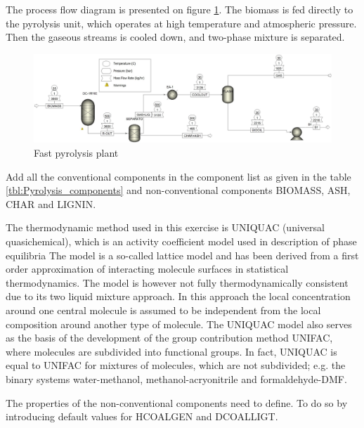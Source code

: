 The process flow diagram is presented on figure \ref{fig:Pyrolasis}. The biomass is fed directly to the pyrolysis unit, which operates at high temperature and atmospheric pressure. Then the gaseous streams is cooled down, and two-phase mixture is separated.

\begin{figure}[h!]
	\centering
	\includegraphics[width=\linewidth]{Figures/TchermochemicalProcesses/Pyrolysis.jpeg}
	\caption{Fast pyrolysis plant}
	\label{fig:Pyrolasis}
\end{figure}

Add all the conventional components in the component list as given in the table \ref{tbl:Pyrolysis_components} and non-conventional components BIOMASS, ASH, CHAR and LIGNIN. 

The thermodynamic method used in this exercise is UNIQUAC (universal quasichemical), which is an activity coefficient model used in description of phase equilibria The model is a so-called lattice model and has been derived from a first order approximation of interacting molecule surfaces in statistical thermodynamics. The model is however not fully thermodynamically consistent due to its two liquid mixture approach. In this approach the local concentration around one central molecule is assumed to be independent from the local composition around another type of molecule. The UNIQUAC model also serves as the basis of the development of the group contribution method UNIFAC, where molecules are subdivided into functional groups. In fact, UNIQUAC is equal to UNIFAC for mixtures of molecules, which are not subdivided; e.g. the binary systems water-methanol, methanol-acryonitrile and formaldehyde-DMF. 

The properties of the non-conventional components need to define. To do so by introducing default values for HCOALGEN and DCOALLIGT.

